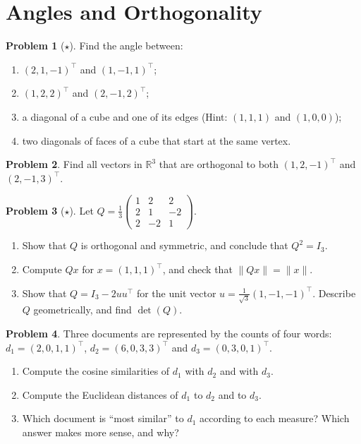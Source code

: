 \documentclass[11pt]{article}
\theoremstyle{definition}
\newtheorem{problem}{Problem}[section]
\newcommand{\norm}[1]{\lVert #1 \rVert}
\begin{document}
\section{Angles and Orthogonality}

\begin{problem}[$\star$]\label{pr:angles}
    Find the angle between:
    \begin{enumerate}[label=(\alph*)]
        \item $(2, 1, -1)^\top$ and $(1, -1, 1)^\top$;
        \item $(1, 2, 2)^\top$ and $(2, -1, 2)^\top$;
        \item a diagonal of a cube and one of its edges (Hint: $(1, 1, 1)$ and $(1, 0, 0)$);
        \item two diagonals of faces of a cube that start at the same vertex.
    \end{enumerate}
\end{problem}

\begin{problem}\label{pr:orth-to-two}
    Find all vectors in $\mathbb{R}^3$ that are orthogonal to both $(1, 2, -1)^\top$ and $(2, -1, 3)^\top$.
\end{problem}

\begin{problem}[$\star$]\label{pr:householder-q}
    Let $Q = \frac{1}{3}\begin{pmatrix} 1 & 2 & 2 \\ 2 & 1 & -2 \\ 2 & -2 & 1 \end{pmatrix}$.
    \begin{enumerate}[label=(\alph*)]
        \item Show that $Q$ is orthogonal and symmetric, and conclude that $Q^2 = I_3$.
        \item Compute $Qx$ for $x = (1, 1, 1)^\top$, and check that $\norm{Qx} = \norm{x}$.
        \item Show that $Q = I_3 - 2uu^\top$ for the unit vector $u = \frac{1}{\sqrt{3}}(1, -1, -1)^\top$. Describe $Q$ geometrically, and find $\det(Q)$.
    \end{enumerate}
\end{problem}

\begin{problem}\label{pr:cosine-docs}
    Three documents are represented by the counts of four words: $d_1 = (2, 0, 1, 1)^\top$, $d_2 = (6, 0, 3, 3)^\top$ and $d_3 = (0, 3, 0, 1)^\top$.
    \begin{enumerate}[label=(\alph*)]
        \item Compute the cosine similarities of $d_1$ with $d_2$ and with $d_3$.
        \item Compute the Euclidean distances of $d_1$ to $d_2$ and to $d_3$.
        \item Which document is ``most similar'' to $d_1$ according to each measure? Which answer makes more sense, and why?
    \end{enumerate}
\end{problem}
\end{document}
